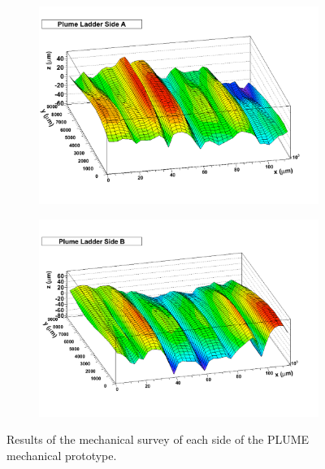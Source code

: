       \begin{figure}[!h]
        \centering
        \begin{subfigure}[t]{0.45\textwidth}
          \centering
          \includegraphics[width = 1.2\textwidth]{Pictures/deformation/surveyResults.pdf}
        \end{subfigure}
        \hfill
        \begin{subfigure}[t]{0.45\textwidth}
          \centering
          \includegraphics[width = 1.2\textwidth]{Pictures/deformation/surveyResultsB.pdf}
        \end{subfigure}

        \caption{Results of the mechanical survey of each side of the PLUME mechanical prototype.}
        \label{fig:mechanicalSurvey}
      \end{figure}

